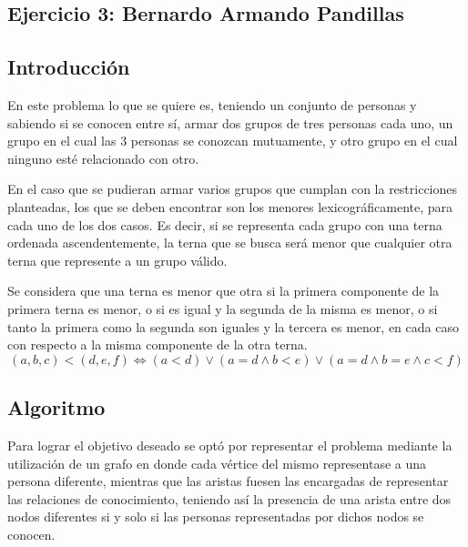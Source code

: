 \documentclass[a4paper, 12pt]{article}
\begin{document}
\begin{center}
\item \section*{Ejercicio 3: Bernardo Armando Pandillas}

\end{center}

\subsection*{Introducción}


En este problema lo que se quiere es, teniendo un conjunto de personas y sabiendo si se conocen entre sí, armar dos grupos de tres personas cada uno, un grupo en el cual las 3 personas se conozcan mutuamente, y otro grupo en el cual ninguno esté relacionado con otro.


En el caso que se pudieran armar varios grupos que cumplan con la restricciones planteadas, los que se deben encontrar son los menores lexicográficamente, para cada uno de los dos casos. Es decir, si se representa cada grupo con una terna ordenada ascendentemente, la terna que se busca será menor que cualquier otra terna que represente a un grupo válido.

Se considera que una terna es menor que otra si la primera componente de la primera terna es menor, o si es igual y la segunda de la misma es menor, o si tanto la primera como la segunda son iguales y la tercera es menor, en cada caso con respecto a la misma componente de la otra terna.
\begin{displaymath}
\left(a, b, c \right) < \left( d, e, f\right) \Leftrightarrow 
\left( a < d \right) \vee \left( a = d \wedge b < e \right) \vee \left( a = d \wedge b = e \wedge c < f \right)
\end{displaymath}


\subsection*{Algoritmo}

Para lograr el objetivo deseado se optó por representar el problema mediante la utilización de un grafo en donde cada vértice del mismo representase a una persona diferente, mientras que las aristas fuesen las encargadas de representar las relaciones de conocimiento, teniendo así la presencia de una arista entre dos nodos diferentes si y solo si las personas representadas por dichos nodos se conocen.
\end{document}
